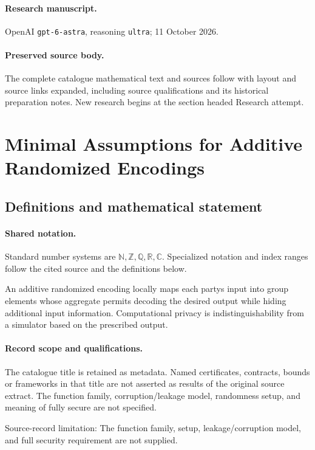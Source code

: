 \documentclass[11pt]{article}
\begin{document}
\paragraph{Research manuscript.} OpenAI \texttt{gpt-6-astra}, reasoning \texttt{ultra}; 11 October 2026.
\paragraph{Preserved source body.} The complete catalogue mathematical text and sources follow with layout and source links expanded, including source qualifications and its historical preparation notes. New research begins at the section headed Research attempt.

\section{Minimal Assumptions for Additive Randomized Encodings}\label{statement}

\subsection{Definitions and mathematical statement}

\paragraph{Shared notation.}Standard number systems are $\mathbb N,\mathbb Z,\mathbb Q,\mathbb R,\mathbb C$. Specialized notation and index ranges follow the cited source and the definitions below.


An additive randomized encoding locally maps each party\textquotesingle s input into group elements whose aggregate permits decoding the desired output while hiding additional input information. Computational privacy is indistinguishability from a simulator based on the prescribed output.
\paragraph{Record scope and qualifications.}
The catalogue title is retained as metadata. Named certificates, contracts, bounds or frameworks in that title are not asserted as results of the original source extract.
The function family, corruption/leakage model, randomness setup, and meaning of fully secure are not specified.

Source-record limitation: The function family, setup, leakage/corruption model, and full security requirement are not supplied.
\end{document}
